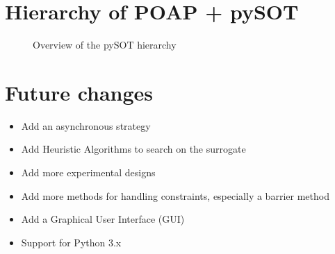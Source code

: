 \documentclass[]{article}
\begin{document}
\section{Hierarchy of POAP + pySOT}
\begin{figure}[!ht] 
	\centering
	\caption{Overview of the pySOT hierarchy} 
\end{figure}
\FloatBarrier

\section{Future changes}
\begin{itemize}
\item Add an asynchronous strategy
\item Add Heuristic Algorithms to search on the surrogate
\item Add more experimental designs
\item Add more methods for handling constraints, especially a barrier method
\item Add a Graphical User Interface (GUI)
\item Support for Python 3.x
\end{itemize}
\end{document}
